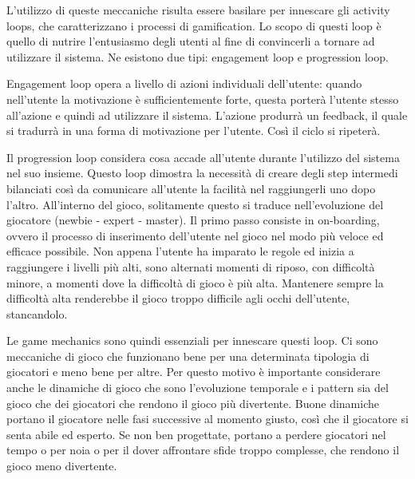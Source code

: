 L'utilizzo di queste meccaniche risulta essere basilare per innescare gli activity loops, che caratterizzano i processi di gamification.
Lo scopo di questi loop è quello di nutrire l'entusiasmo degli utenti al fine di convincerli a tornare ad utilizzare il sistema. Ne esistono due tipi: engagement loop e progression loop.

Engagement loop opera a livello di azioni individuali dell'utente: quando nell'utente la motivazione è sufficientemente forte, questa porterà l'utente stesso all'azione e quindi ad utilizzare il sistema. L'azione produrrà un feedback, il quale si tradurrà in una forma di motivazione per l'utente. Così il ciclo si ripeterà.

Il progression loop considera cosa accade all'utente durante l'utilizzo del sistema nel suo insieme. Questo loop dimostra la necessità di creare degli step intermedi bilanciati così da comunicare all'utente la facilità nel raggiungerli uno dopo l'altro. All'interno del gioco, solitamente questo si traduce nell'evoluzione del giocatore (newbie - expert - master). Il primo passo consiste in on-boarding, ovvero il processo di inserimento dell'utente nel gioco nel modo più veloce ed efficace possibile. Non appena l'utente ha imparato le regole ed inizia a raggiungere i livelli più alti, sono alternati momenti di riposo, con difficoltà minore, a momenti dove la difficoltà di gioco è più alta. Mantenere sempre la difficoltà alta renderebbe il gioco troppo difficile agli occhi dell'utente, stancandolo.

Le game mechanics sono quindi essenziali per innescare questi loop. Ci sono meccaniche di gioco che funzionano bene per una determinata tipologia di giocatori e meno bene per altre. Per questo motivo è importante considerare anche le dinamiche di gioco che sono l'evoluzione temporale e i pattern sia del gioco che dei giocatori che rendono il gioco più divertente. Buone dinamiche portano il giocatore nelle fasi successive al momento giusto, così che il giocatore si senta abile ed esperto. Se non ben progettate, portano a perdere giocatori nel tempo o per noia o per il dover affrontare sfide troppo complesse, che rendono il gioco meno divertente.


